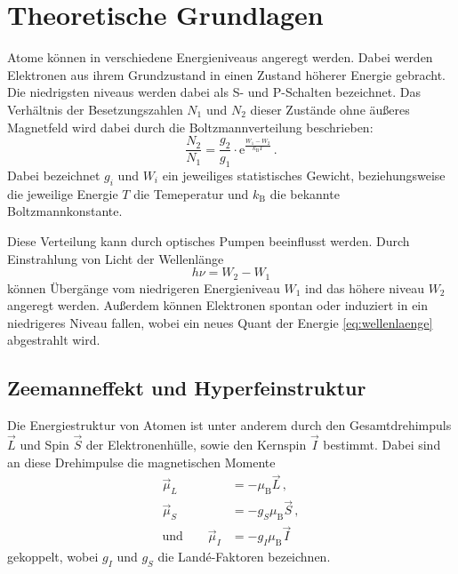 \section{Theoretische Grundlagen}
\label{sec:theoretische_grundlagen}
Atome können in verschiedene Energieniveaus angeregt werden. Dabei werden
Elektronen aus ihrem Grundzustand in einen Zustand höherer Energie gebracht.
Die niedrigsten niveaus werden dabei als S- und P-Schalten bezeichnet.  Das
Verhältnis der Besetzungszahlen $N_1$ und $N_2$ dieser Zustände ohne äußeres
Magnetfeld wird dabei durch die Boltzmannverteilung beschrieben:
\begin{equation}
\label{eq:boltzmann}
    \frac{N_2}{N_1} = \frac{g_2}{g_1}\cdot
        \mathrm{e}^\frac{W_1 - W_2}{k_\text{B}T}\,.
\end{equation}
Dabei bezeichnet $g_i$ und $W_i$ ein jeweiliges statistisches Gewicht,
beziehungsweise die jeweilige Energie $T$ die Temeperatur und $k_\text{B}$ die
bekannte Boltzmannkonstante.

Diese Verteilung kann durch optisches Pumpen beeinflusst werden.
Durch Einstrahlung von Licht der Wellenlänge
\begin{equation}
\label{eq:wellenlaenge}
    h\nu = W_2 - W_1
\end{equation}
können Übergänge vom niedrigeren Energieniveau $W_1$ ind das höhere niveau
$W_2$ angeregt werden. Außerdem können Elektronen spontan oder induziert in ein
niedrigeres Niveau fallen, wobei ein neues Quant der Energie
\ref{eq:wellenlaenge} abgestrahlt wird.

\subsection{Zeemanneffekt und Hyperfeinstruktur}
\label{subsec:zeemanneffekt_und_hyperfeinstruktur}
Die Energiestruktur von Atomen ist unter anderem durch den Gesamtdrehimpuls
$\vec{L}$ und Spin $\vec{S}$ der Elektronenhülle, sowie den Kernspin $\vec{I}$
bestimmt. Dabei sind an diese Drehimpulse die magnetischen Momente
\begin{align}
    \vec{\mu}_L &= -\mu_\text{B}\vec{L}\,,
        \label{eq:magn_moment_elektronen}\\
    \vec{\mu}_S &= -g_S\mu_\text{B}\vec{S}\,,
        \label{eq:magn_moment_espin}\\
    \text{und}\qquad\vec{\mu}_I &= -g_I\mu_\text{B}\vec{I}
        \label{eq:magn_moment_kernspin}
\end{align}
gekoppelt, wobei $g_I$ und $g_S$ die Landé-Faktoren bezeichnen.
